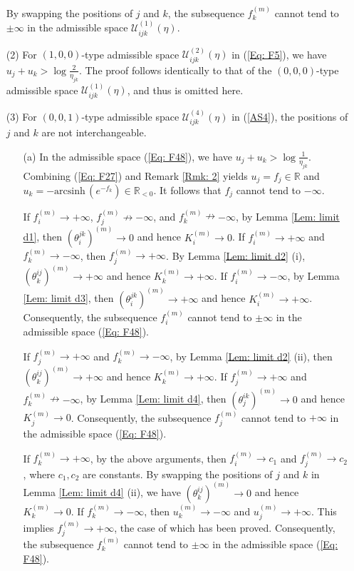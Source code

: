\documentclass[12pt]{amsart}
\theoremstyle{definition}
\begin{document}
\begin{itemize}
By swapping the positions of $j$ and $k$, the subsequence $f^{(m)}_k$ cannot tend to $\pm\infty$ in the admissible space $\mathcal{U}^{(1)}_{ijk}(\eta)$.

\item[(2)]
For $(1,0,0)$-type admissible space $\mathcal{U}^{(2)}_{ijk}(\eta)$ in (\ref{Eq: F5}), we have $u_j+u_k>\log \frac{2}{\eta_{jk}}$.
The proof follows identically to that of the $(0,0,0)$-type admissible space $\mathcal{U}^{(1)}_{ijk}(\eta)$, and thus is omitted here.

\item[(3)]
For $(0,0,1)$-type admissible space $\mathcal{U}^{(4)}_{ijk}(\eta)$ in (\ref{AS4}), the positions of $j$ and $k$ are not interchangeable.
\begin{itemize}
\item[(a)]
In the admissible space (\ref{Eq: F48}),
we have $u_j+u_k>\log \frac{1}{\eta_{jk}}$.
Combining (\ref{Eq: F27}) and Remark \ref{Rmk: 2} yields $u_j=f_j\in \mathbb{R}$ and $u_k=-\mathrm{arcsinh}\, (e^{-f_k})\in \mathbb{R}_{<0}$.
It follows that $f_j$ cannot tend to $-\infty$.

If $f_i^{(m)}\rightarrow +\infty$, $f_j^{(m)}\nrightarrow -\infty$, and $f_k^{(m)}\nrightarrow -\infty$,
by Lemma \ref{Lem: limit d1},
then $(\theta^{jk}_i)^{(m)}\rightarrow 0$ and hence $K^{(m)}_i\rightarrow 0$.
If $f_i^{(m)}\rightarrow +\infty$ and $f_k^{(m)}\rightarrow -\infty$, then $f_j^{(m)}\rightarrow +\infty$.
By Lemma \ref{Lem: limit d2} (i),  $(\theta^{ij}_k)^{(m)}\rightarrow +\infty$ and hence $K^{(m)}_k\rightarrow +\infty$.
If $f_i^{(m)}\rightarrow -\infty$, by Lemma \ref{Lem: limit d3}, then $(\theta^{jk}_i)^{(m)}\rightarrow +\infty$ and hence $K^{(m)}_i\rightarrow +\infty$.
Consequently, the subsequence $f^{(m)}_i$ cannot tend to $\pm\infty$ in the admissible space (\ref{Eq: F48}).

If $f_j^{(m)}\rightarrow +\infty$ and  $f_k^{(m)}\rightarrow -\infty$, by Lemma \ref{Lem: limit d2} (ii), then $(\theta^{ij}_k)^{(m)}\rightarrow +\infty$ and hence $K^{(m)}_k\rightarrow +\infty$.
If $f_j^{(m)}\rightarrow +\infty$ and  $f_k^{(m)}\nrightarrow -\infty$, by Lemma \ref{Lem: limit d4}, then $(\theta^{ik}_j)^{(m)}\rightarrow 0$ and hence $K^{(m)}_j\rightarrow 0$.
Consequently, the subsequence $f^{(m)}_j$ cannot tend to $+\infty$ in the admissible space (\ref{Eq: F48}).

If $f_k^{(m)}\rightarrow +\infty$, by the above arguments, then $f_i^{(m)}\rightarrow c_1$ and $f_j^{(m)}\rightarrow c_2$, where $c_1,c_2$ are constants.
By swapping the positions of $j$ and $k$ in Lemma \ref{Lem: limit d4} (ii), we have $(\theta^{ij}_k)^{(m)}\rightarrow 0$ and hence $K^{(m)}_k\rightarrow 0$.
If $f_k^{(m)}\rightarrow -\infty$, then $u_k^{(m)}\rightarrow -\infty$ and $u_j^{(m)}\rightarrow +\infty$.
This implies $f_j^{(m)}\rightarrow +\infty$, the case of which has been proved.
Consequently, the subsequence $f^{(m)}_k$ cannot tend to $\pm\infty$ in the admissible space (\ref{Eq: F48}).


\end{itemize}
\end{itemize}
\end{document}

